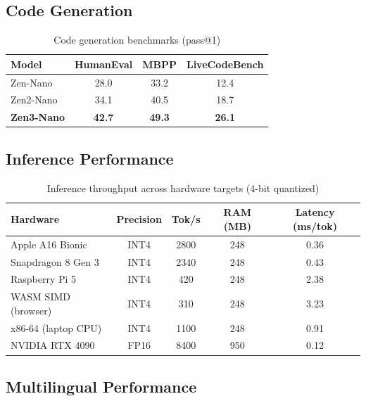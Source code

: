 \documentclass[11pt,a4paper]{article}
\begin{document}
\subsection{Code Generation}

\begin{table}[H]
\centering
\caption{Code generation benchmarks (pass@1)}
\begin{tabular}{lccc}
\toprule
\textbf{Model} & \textbf{HumanEval} & \textbf{MBPP} & \textbf{LiveCodeBench} \\
\midrule
Zen-Nano     & 28.0 & 33.2 & 12.4 \\
Zen2-Nano    & 34.1 & 40.5 & 18.7 \\
\textbf{Zen3-Nano} & \textbf{42.7} & \textbf{49.3} & \textbf{26.1} \\
\bottomrule
\end{tabular}
\label{tab:code}
\end{table}

\subsection{Inference Performance}

\begin{table}[H]
\centering
\caption{Inference throughput across hardware targets (4-bit quantized)}
\begin{tabular}{lcccc}
\toprule
\textbf{Hardware} & \textbf{Precision} & \textbf{Tok/s} & \textbf{RAM (MB)} & \textbf{Latency (ms/tok)} \\
\midrule
Apple A16 Bionic      & INT4 & 2800 & 248 & 0.36 \\
Snapdragon 8 Gen 3    & INT4 & 2340 & 248 & 0.43 \\
Raspberry Pi 5        & INT4 &  420 & 248 & 2.38 \\
WASM SIMD (browser)   & INT4 &  310 & 248 & 3.23 \\
x86-64 (laptop CPU)   & INT4 & 1100 & 248 & 0.91 \\
NVIDIA RTX 4090       & FP16 & 8400 & 950 & 0.12 \\
\bottomrule
\end{tabular}
\label{tab:perf}
\end{table}

\subsection{Multilingual Performance}
\end{document}
